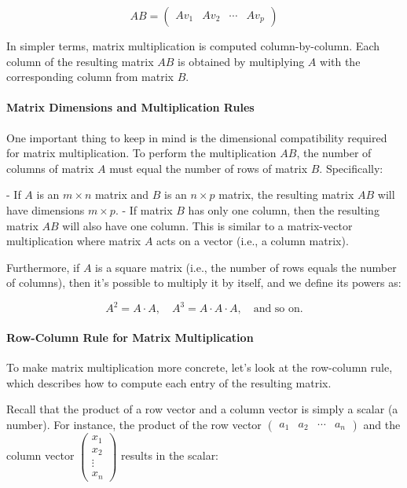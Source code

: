 \documentclass[a4paper,12pt]{article}
\begin{document}
\[
AB = \begin{pmatrix}
Av_1 & Av_2 & \cdots & Av_p
\end{pmatrix}
\]

In simpler terms, matrix multiplication is computed column-by-column. Each column of the resulting matrix \( AB \) is obtained by multiplying \( A \) with the corresponding column from matrix \( B \).

\paragraph{Matrix Dimensions and Multiplication Rules}

One important thing to keep in mind is the dimensional compatibility required for matrix multiplication. To perform the multiplication \( AB \), the number of columns of matrix \( A \) must equal the number of rows of matrix \( B \). Specifically:

- If \( A \) is an \( m \times n \) matrix and \( B \) is an \( n \times p \) matrix, the resulting matrix \( AB \) will have dimensions \( m \times p \).
- If matrix \( B \) has only one column, then the resulting matrix \( AB \) will also have one column. This is similar to a matrix-vector multiplication where matrix \( A \) acts on a vector (i.e., a column matrix).

Furthermore, if \( A \) is a square matrix (i.e., the number of rows equals the number of columns), then it’s possible to multiply it by itself, and we define its powers as:

\[
A^2 = A \cdot A, \quad A^3 = A \cdot A \cdot A, \quad \text{and so on.}
\]

\paragraph{Row-Column Rule for Matrix Multiplication}

To make matrix multiplication more concrete, let’s look at the row-column rule, which describes how to compute each entry of the resulting matrix.

Recall that the product of a row vector and a column vector is simply a scalar (a number). For instance, the product of the row vector \( \begin{pmatrix} a_1 & a_2 & \cdots & a_n \end{pmatrix} \) and the column vector \( \begin{pmatrix} x_1 \\ x_2 \\ \vdots \\ x_n \end{pmatrix} \) results in the scalar:
\end{document}
